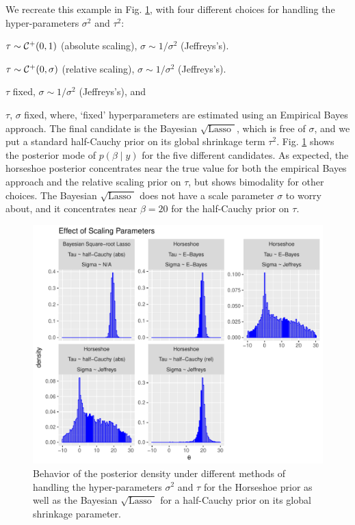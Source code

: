 \documentclass[chapters]{uamaththesis}
\def\sql{$\sqrt{\text{Lasso }}$}
\begin{document}
We recreate this example in Fig. \ref{fig:effect-sigma}, with four different choices for handling the hyper-parameters $\sigma^2$ and $\tau^2$: 
\ben 
\item $\tau \sim \mathcal{C}^+(0,1)$ (absolute scaling), $\sigma \sim 1/\sigma^2$ (Jeffreys's). 
\item $\tau \sim \mathcal{C}^+(0,\sigma)$ (relative scaling), $\sigma \sim 1/\sigma^2$ (Jeffreys's). 
\item $\tau$ fixed, $\sigma \sim 1/\sigma^2$ (Jeffreys's), and
\item $\tau$, $\sigma$ fixed, 
\een
where, `fixed' hyperparameters are estimated using an Empirical Bayes approach. The final candidate is the Bayesian \sql{}, which is free of $\sigma$, and we put a standard half-Cauchy prior on its global shrinkage term $\tau^2$. Fig. \ref{fig:effect-sigma} shows the posterior mode of $p(\beta \mid y)$ for the five different candidates. As expected, the horseshoe posterior concentrates near the true value for both the empirical Bayes approach and the relative scaling prior on $\tau$, but shows bimodality for other choices. The Bayesian \sql{} does not have a scale parameter $\sigma$ to worry about, and it concentrates near $\beta = 20$ for the half-Cauchy prior on $\tau$. 

\begin{figure}[!ht]%
\centering
\includegraphics[width=0.9\columnwidth]{art/effect_of_sigma}%
\caption{Behavior of the posterior density under different methods of handling the hyper-parameters $\sigma^2$ and $\tau$ for the Horseshoe prior as well as the Bayesian \sql{} for a half-Cauchy prior on its global shrinkage parameter. }%
\label{fig:effect-sigma}%
\end{figure}
\end{document}
